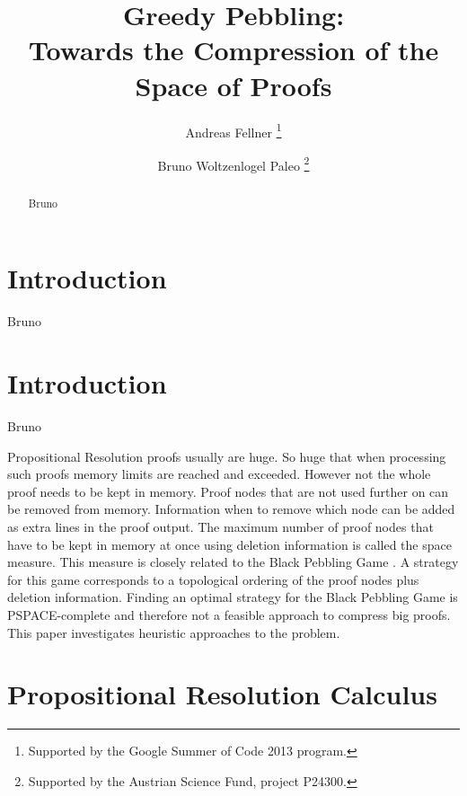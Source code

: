 \documentclass{llncs}
\title{Greedy Pebbling: \\ 
Towards the Compression of the Space of Proofs}
\author{
  Andreas Fellner 
  \thanks{Supported by the Google Summer of Code 2013 program.}
  \and 
  Bruno Woltzenlogel Paleo 
  \thanks{Supported by the Austrian Science Fund, project P24300.}
}
\institute{
  \email{fellner.a@gmail.com} \ \ \ \email{bruno@logic.at} \\
  Theory and Logic Group \\
  Institute for Computer Languages \\
  Vienna University of Technology
}
\begin{document}
\maketitle

\begin{abstract}
Bruno
\end{abstract}

\setcounter{footnote}{0}

\section{Introduction}

Bruno

\section{Introduction}
Bruno

Propositional Resolution proofs usually are huge. So huge that when processing such proofs memory limits are reached and exceeded.
However not the whole proof needs to be kept in memory. 
Proof nodes that are not used further on can be removed from memory.
Information when to remove which node can be added as extra lines in the proof output.
The maximum number of proof nodes that have to be kept in memory at once using deletion information is called the space measure.
This measure is closely related to the Black Pebbling Game \cite{kasai1979classes,gilbert1980pebbling}.
A strategy for this game corresponds to a topological ordering of the proof nodes plus deletion information.
Finding an optimal strategy for the Black Pebbling Game is PSPACE-complete \cite{gilbert1980pebbling} and therefore not a feasible approach to compress big proofs.
This paper investigates heuristic approaches to the problem.

\section{Propositional Resolution Calculus}
\end{document}
